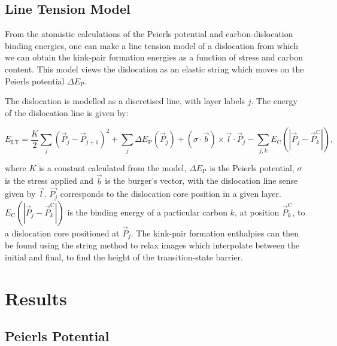 \documentclass[a4paper,11pt]{article}
\begin{document}
\subsection{Line Tension Model}
\label{sec:org9015aa1}

From the atomistic calculations of the Peierls potential and carbon-dislocation binding energies, one can make a
line tension model of a dislocation from which we can obtain the kink-pair formation energies as
a function of stress and carbon content. This model views the dislocation as an elastic string
which moves on the Peierls potential \(\Delta E_{\text{P}}\).

The dislocation is modelled as a discretised line, with layer labels \(j\). The energy of the
dislocation line is given by:

\[ E_{\text{LT}} = \frac{K}{2} \sum_j (\vec{P}_j - \vec{P}_{j+1} )^2  + \sum_j \Delta E_{\text{P}}  (\vec{P}_j) +
   (\sigma \cdot \vec{b}) \times \vec{l} \cdot \vec{P}_j  - \sum_{j,k} E_{\text{C}} (|\vec{P}_j-\vec{P}_k^{\text{C}}|), \]

where \(K\) is a constant calculated from the model, \(\Delta E_{\text{P}}\) is the Peierls potential, \(\sigma\) is
the stress applied and \(\vec{b}\) is the burger's vector, with the dislocation line sense given by
\(\vec{l}\). \(\vec{P_{j}}\) corresponds to the dislocation core position in a given
layer. \(E_{\text{C}} (|\vec{P}_j-\vec{P}_k^{\text{C}}|)\) is the binding energy of a particular carbon
\(k\), at position \(\vec{P}_k^{\text{C}}\), to a dislocation core positioned at \(\vec{P}_j\). The kink-pair
formation enthalpies can then be found using the string method to
relax images which interpolate between the initial and final, to find the height of the transition-state
barrier. 

\section{Results}
\label{sec:org6129117}

\subsection{Peierls Potential}
\label{sec:orgce9bf2c}
\end{document}
